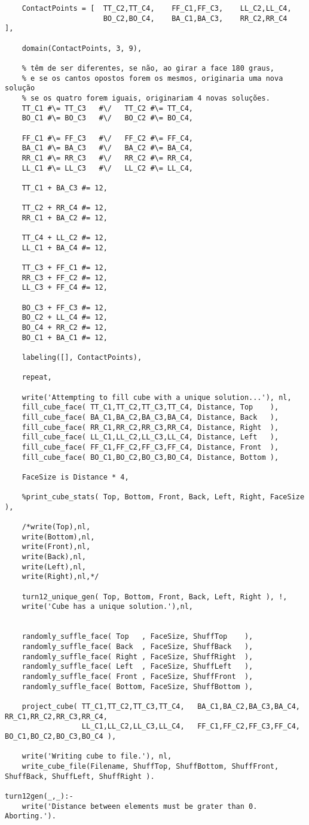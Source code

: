 \begin{lstlisting}
	ContactPoints = [  TT_C2,TT_C4,    FF_C1,FF_C3,    LL_C2,LL_C4,
                       BO_C2,BO_C4,    BA_C1,BA_C3,    RR_C2,RR_C4   ],

	domain(ContactPoints, 3, 9),
	
	% têm de ser diferentes, se não, ao girar a face 180 graus,
	% e se os cantos opostos forem os mesmos, originaria uma nova solução
	% se os quatro forem iguais, originariam 4 novas soluções.
	TT_C1 #\= TT_C3   #\/   TT_C2 #\= TT_C4,
	BO_C1 #\= BO_C3   #\/   BO_C2 #\= BO_C4,
	
	FF_C1 #\= FF_C3   #\/   FF_C2 #\= FF_C4,
	BA_C1 #\= BA_C3   #\/   BA_C2 #\= BA_C4,
	RR_C1 #\= RR_C3   #\/   RR_C2 #\= RR_C4,
	LL_C1 #\= LL_C3   #\/   LL_C2 #\= LL_C4,

	TT_C1 + BA_C3 #= 12,
		
	TT_C2 + RR_C4 #= 12,
	RR_C1 + BA_C2 #= 12,
	
	TT_C4 + LL_C2 #= 12,
	LL_C1 + BA_C4 #= 12,

	TT_C3 + FF_C1 #= 12,
	RR_C3 + FF_C2 #= 12,
	LL_C3 + FF_C4 #= 12,

	BO_C3 + FF_C3 #= 12,
	BO_C2 + LL_C4 #= 12,
	BO_C4 + RR_C2 #= 12,
	BO_C1 + BA_C1 #= 12,
	
	labeling([], ContactPoints),
	
	repeat,
	
	write('Attempting to fill cube with a unique solution...'), nl,
	fill_cube_face( TT_C1,TT_C2,TT_C3,TT_C4, Distance, Top    ),
	fill_cube_face( BA_C1,BA_C2,BA_C3,BA_C4, Distance, Back   ),
	fill_cube_face( RR_C1,RR_C2,RR_C3,RR_C4, Distance, Right  ),
	fill_cube_face( LL_C1,LL_C2,LL_C3,LL_C4, Distance, Left   ),
	fill_cube_face( FF_C1,FF_C2,FF_C3,FF_C4, Distance, Front  ),
	fill_cube_face( BO_C1,BO_C2,BO_C3,BO_C4, Distance, Bottom ),
	
	FaceSize is Distance * 4,
	
	%print_cube_stats( Top, Bottom, Front, Back, Left, Right, FaceSize ),

	/*write(Top),nl,
	write(Bottom),nl,
	write(Front),nl,
	write(Back),nl,
	write(Left),nl,
	write(Right),nl,*/
	
	turn12_unique_gen( Top, Bottom, Front, Back, Left, Right ), !,
	write('Cube has a unique solution.'),nl,
	

	randomly_suffle_face( Top   , FaceSize, ShuffTop    ),
	randomly_suffle_face( Back  , FaceSize, ShuffBack   ),
	randomly_suffle_face( Right , FaceSize, ShuffRight  ),
	randomly_suffle_face( Left  , FaceSize, ShuffLeft   ),
	randomly_suffle_face( Front , FaceSize, ShuffFront  ),
	randomly_suffle_face( Bottom, FaceSize, ShuffBottom ),
	
	project_cube( TT_C1,TT_C2,TT_C3,TT_C4,   BA_C1,BA_C2,BA_C3,BA_C4,   RR_C1,RR_C2,RR_C3,RR_C4,
                  LL_C1,LL_C2,LL_C3,LL_C4,   FF_C1,FF_C2,FF_C3,FF_C4,   BO_C1,BO_C2,BO_C3,BO_C4 ),
				  
	write('Writing cube to file.'), nl,
	write_cube_file(Filename, ShuffTop, ShuffBottom, ShuffFront, ShuffBack, ShuffLeft, ShuffRight ).

turn12gen(_,_):-
	write('Distance between elements must be grater than 0. Aborting.').
\end{lstlisting}